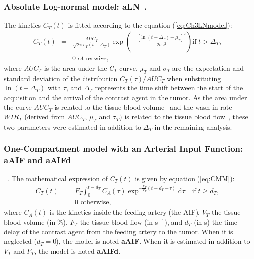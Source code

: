 \subsubsection{Absolute Log-normal model: aLN~\cite{Strouthos2010it}.}
The kinetics $C_T(t)$ is fitted according to the equation (\ref{eq:Ch3LNmodel}):
\begin{equation}
\begin{array}{rcl}
C_T(t) &= & \frac{AUC_T}{\sqrt{2 \pi}\sigma_T (t- \Delta_T)} \exp \left( - \frac{\left[ \ln{(t- \Delta_T)} - \mu_T \right]^2}{2{\sigma_T}^2} \right) \textrm{if } t > \Delta_T, \\
&=& \textrm{0 otherwise,}
\end{array}
\label{eq:Ch3LNmodel}
\end{equation}
where $AUC_T$ is the area under the $C_T$ curve, $\mu_T$  and $\sigma_T$ are the expectation and standard deviation of the distribution $C_T(\tau)/AUC_T$ when substituting $\ln(t- \Delta_T)$ with $\tau$, and $\Delta_T$ represents the time shift between the start of the acquisition and the arrival of the contrast agent in the tumor. As the area under the curve $AUC_T$ is related to the tissue blood volume~\cite{Tudorica2002at} and the wash-in rate $WIR_T$ (derived from $AUC_T$, $\mu_T$ and $\sigma_T$) is related to the tissue blood flow~\cite{Dietrich2012kw}, these two parameters were estimated in addition to $\Delta_T$ in the remaining analysis.

\subsubsection{One-Compartment model with an Arterial Input Function: \textbf{aAIF} and \textbf{aAIFd}}~\cite{Gunn2001gr}. The mathematical expression of $C_T(t)$ is given by equation (\ref{eq:CMM}):
\label{sec:AIFmodel} 
\begin{equation}
\label{eq:CMM}
\begin{array}{rcl}
C_T (t)  &= & F_T \int_{0}^{t- d_T} C_A \left( \tau \right) \exp^{-\frac{F_T}{V_T} \left( t - d_T - \tau \right)}\mathrm d \tau \quad \textrm{if } t \geq d_T,\\
&=& \textrm{0 otherwise,}
\end{array}
\end{equation}
where $C_A(t)$ is the kinetics inside the feeding artery (the AIF), $V_T$ the tissue blood volume (in \%), $F_T$ the tissue blood flow (in s$^{-1}$), and $d_T$ (in s) the time-delay of the contrast agent from the feeding artery to the tumor. When it is neglected ($d_T=0$), the model is noted \textbf{aAIF}. When it is estimated in addition to $V_T$ and $F_T$, the model is noted \textbf{aAIFd}.

